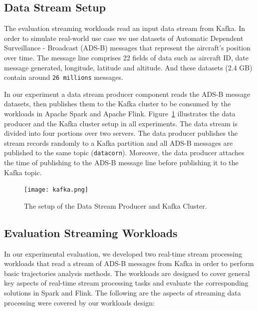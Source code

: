 \documentclass[]{article}
\begin{document}
\subsection{Data Stream Setup}
The evaluation streaming workloads read an input data stream from Kafka. In order to simulate real-world use case we use datasets of Automatic Dependent Surveillance - Broadcast (ADS-B) messages that represent the aircraft's position over time. The message line comprises 22 fields of data such as aircraft ID, date message generated, longitude, latitude and altitude.  And  these datasets (2.4 GB) contain around \texttt{26 millions}  messages.  
\par In our experiment a data stream producer component reads the ADS-B message datasets, then publishes them to the Kafka cluster to be consumed by the workloads in Apache Spark and Apache Flink. Figure~\ref{fig:data_stream} illustrates the data producer and the Kafka cluster setup in all experiments.
The data stream is divided into four portions over two servers. The data producer publishes the stream records randomly to a Kafka partition and all ADS-B messages are published to the same topic (\texttt{datacorn}). Moreover, the data producer attaches the time of publishing to the ADS-B message line before publishing it to the Kafka topic.

\begin{figure}[h]
 
  \centering
    \texttt{[image: kafka.png]}
     \caption{The setup of the Data Stream Producer and Kafka Cluster.}
     \label{fig:data_stream}
\end{figure} 

\newpage
\subsection{Evaluation Streaming Workloads}
In our experimental evaluation, we developed two real-time stream processing workloads that read a stream of ADS-B messages from Kafka in order to perform basic trajectories analysis methods. The workloads are designed to cover general key aspects of real-time stream processing tasks and evaluate the corresponding solutions in Spark and Flink. The following are the aspects of streaming data processing were covered by our workloads design: 
\end{document}
